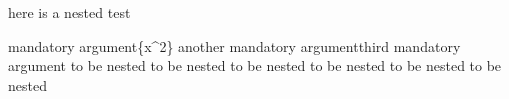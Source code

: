 here is a nested test
\begin{one}{mandatory argument}{\{x^2\} %
		another mandatory argument}{third mandatory argument }%
	to be nested to be nested
	to be nested to be nested
	to be nested to be nested
\end{one}
